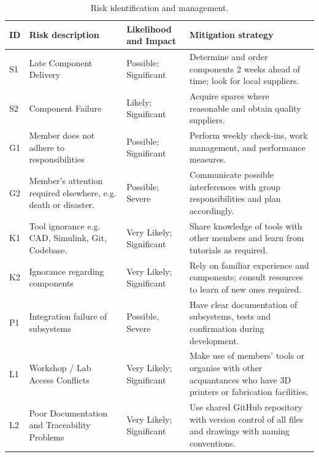 \begin{table}[H]
    \caption{Risk identification and management.}
    \label{tab:risk-register}
    \begin{tabular}{@{} l p{4cm} p{4.5cm} p{8cm} @{}}
        \toprule
        \textbf{ID} & \textbf{Risk description}
                    & \textbf{Likelihood and Impact}
                    & \textbf{Mitigation strategy}                                                                    \\
        \midrule
        S1          & Late Component Delivery
                    & Possible; Significant
                    & Determine and order components 2 weeks ahead of time; look for local suppliers.                 \\
        S2          & Component Failure
                    & Likely; Significant
                    & Acquire spares where reasonable and obtain quality suppliers.  \\
        G1          & Member does not adhere to responsibilities
                    & Possible; Significant
                    & Perform weekly check-ins, work management, and performance measures.                            \\
        G2          & Member's attention required elsewhere, e.g. death or disaster.
                    & Possible; Severe
                    & Communicate possible interferences with group responsibilities and plan accordingly.            \\
        K1          & Tool ignorance e.g. CAD, Simulink, Git, Codebase.
                    & Very Likely; Significant                                                                                      
                    & Share knowledge of tools with other members and learn from tutorials as required.               \\
        K2          & Ignorance regarding components
                    & Very Likely; Significant                                                                                     
                    & Rely on familiar experience and components; consult resources to learn of new ones required.    \\
        P1          & Integration failure of subsystems 
                    & Possible, Severe
                    & Have clear documentation of subsystems, tests and confirmation during development.                                \\
        L1          & Workshop / Lab Access Conflicts 
                    & Very Likely; Significant
                    & Make use of members' tools or organise with other acquantances who have 3D printers or fabrication facilities. \\
        L2          & Poor Documentation and Traceability Problems          
                    & Very Likely; Significant 
                    & Use shared GitHub repository with version control of all files and drawings with naming conventions.   \\
        \bottomrule
    \end{tabular}
\end{table}


